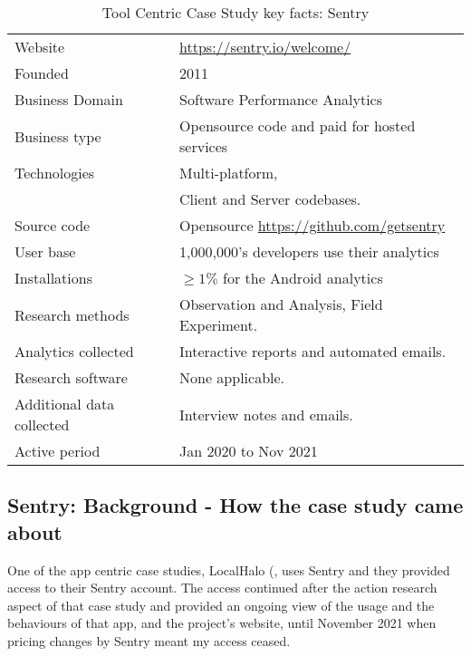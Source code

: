 {\renewcommand{\arraystretch}{0.8}%
\begin{table}[htbp!]
    \centering
    \small
    \setlength{\tabcolsep}{1pt}
    \begin{tabular}{lp{9cm}}
       \toprule
       Website &\url{https://sentry.io/welcome/} \\
       Founded & 2011 \\ %
       Business Domain & Software Performance Analytics \\
       Business type & Opensource code and paid for hosted services \\
       Technologies  & Multi-platform, \\
       & Client and Server codebases. \\
       Source code  & Opensource \url{https://github.com/getsentry} \\
       \midrule
       User base & 1,000,000's developers use their analytics~\citep{sentry_customers}  \\
       Installations & \( \geq 1\% \) for the Android analytics\footnotemark \\
       \midrule
       Research methods &Observation and Analysis, Field Experiment. \\
       Analytics collected &Interactive reports and automated emails. \\
       Research software & None applicable. \\
       Additional data collected &Interview notes and emails. \\
       Active period & Jan 2020 to Nov 2021 \\
       \bottomrule
    \end{tabular}
    \caption{Tool Centric Case Study key facts: Sentry}
    \label{tab:blank_case_study_anaytics_overview}
\end{table}
}



\subsection{Sentry: Background - How the case study came about}
One of the app centric case studies, LocalHalo (, uses Sentry and they provided access to their Sentry account. The access continued after the action research aspect of that case study and provided an ongoing view of the usage and the behaviours of that app, and the project's website, until November 2021 when pricing changes by Sentry meant my access ceased.

